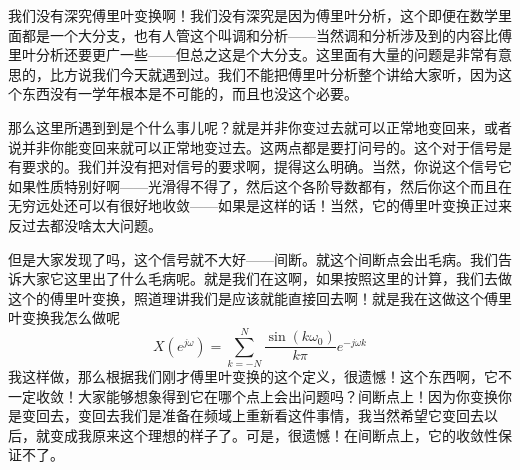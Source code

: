 \documentclass[a4paper,12pt]{article}
\begin{document}
我们没有深究傅里叶变换啊！我们没有深究是因为傅里叶分析，这个即便在数学里面都是一个大分支，也有人管这个叫调和分析——当然调和分析涉及到的内容比傅里叶分析还要更广一些——但总之这是个大分支。这里面有大量的问题是非常有意思的，比方说我们今天就遇到过。我们不能把傅里叶分析整个讲给大家听，因为这个东西没有一学年根本是不可能的，而且也没这个必要。

那么这里所遇到到是个什么事儿呢？就是并非你变过去就可以正常地变回来，或者说并非你能变回来就可以正常地变过去。这两点都是要打问号的。这个对于信号是有要求的。我们并没有把对信号的要求啊，提得这么明确。当然，你说这个信号它如果性质特别好啊——光滑得不得了，然后这个各阶导数都有，然后你这个而且在无穷远处还可以有很好地收敛——如果是这样的话！当然，它的傅里叶变换正过来反过去都没啥太大问题。

但是大家发现了吗，这个信号就不大好——间断。就这个间断点会出毛病。我们告诉大家它这里出了什么毛病呢。就是我们在这啊，如果按照这里的计算，我们去做这个的傅里叶变换，照道理讲我们是应该就能直接回去啊！就是我在这做这个傅里叶变换我怎么做呢
\begin{equation}
    X\left ( e^{j\omega } \right) = \sum_{k=-N}^{N}\frac{\sin \left( k\omega_0 \right)}{k\pi}e^{-j\omega k}
\end{equation}
我这样做，那么根据我们刚才傅里叶变换的这个定义，很遗憾！这个东西啊，它不一定收敛！大家能够想象得到它在哪个点上会出问题吗？间断点上！因为你变换你是变回去，变回去我们是准备在频域上重新看这件事情，我当然希望它变回去以后，就变成我原来这个理想的样子了。可是，很遗憾！在间断点上，它的收敛性保证不了。
\end{document}
